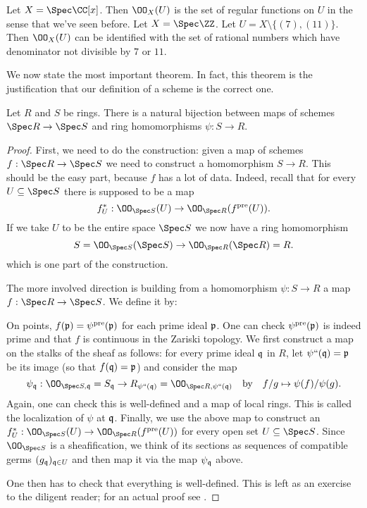 \documentclass[11pt]{scrreprt}
\begin{document}
\begin{example}
	\listhack
	\begin{enumerate}[(a)]
		\ii Let $X = \Spec \CC[x]$.
		Then $\OO_X(U)$ is the set of regular functions on $U$
		in the sense that we've seen before.
		\ii Let $X = \Spec \ZZ$.
		Let $U = X \setminus \{ (7), (11) \}$.
		Then $\OO_X(U)$ can be identified with the set of rational numbers
		which have denominator not divisible by $7$ or $11$.
	\end{enumerate}
\end{example}

We now state the most important theorem.
In fact, this theorem is the justification that our definition
of a scheme is the correct one.
\begin{theorem}
	Let $R$ and $S$ be rings.
	There is a natural bijection between maps of schemes $\Spec R \to \Spec S$	
	and ring homomorphisms $\psi : S \to R$.
\end{theorem}
\begin{proof}
	First, we need to do the construction:
	given a map of schemes $f : \Spec R \to \Spec S$ 
	we need to construct a homomorphism $S \to R$.
	This should be the easy part, because $f$ has a lot of data.
	Indeed, recall that for every $U \subseteq \Spec S$
	there is supposed to be a map
	\[ f^\ast_U : \OO_{\Spec S} (U) \to \OO_{\Spec R}(f\pre(U)). \]
	If we take $U$ to be the entire space $\Spec S$ we now have a ring homomorphism
	\[ S = \OO_{\Spec S} (\Spec S) \to \OO_{\Spec R} (\Spec R) = R. \]
	which is one part of the construction.

	The more involved direction is building from a homomorphism
	$\psi : S \to R$ a map $f : \Spec R \to \Spec S$.
	We define it by:
	\begin{itemize}
		\ii On points, $f(\mathfrak p) = \psi^{\text{pre}}(\mathfrak p)$ for each prime ideal $\mathfrak p$.
		One can check $\psi^{\text{pre}}(\mathfrak p)$ is indeed prime
		and that $f$ is continuous in the Zariski topology.
		\ii We first construct a map on the stalks of the sheaf as follows:
		for every prime ideal $\mathfrak q$ in $R$, let $\psi``(\mathfrak q) = \mathfrak p$ be its image
		(so that $f(\mathfrak q) = \mathfrak p$) and consider the map
		\[ \psi_\qq : \OO_{\Spec S, \qq} = S_{\qq}
			\to R_{\psi``(\qq)} = \OO_{\Spec R, \psi``(\qq)}
			\quad\text{by}\quad f/g \mapsto \psi(f)/\psi(g). \]
		Again, one can check this is well-defined and a map of local rings.
		This is called the localization of $\psi$ at $\mathfrak q$.
		\ii Finally, we use the above map to construct an
		$f^\ast_U : \OO_{\Spec S}(U) \to \OO_{\Spec R}(f\pre(U))$
		for every open set  $U \subseteq \Spec S$.
		Since $\OO_{\Spec S}$ is a sheafification, we think of its
		sections as sequences of compatible germs $(g_\mathfrak q)_{\mathfrak q \in U}$
		and then map it via the map $\psi_\mathfrak q$ above.
	\end{itemize}
	One then has to check that everything is well-defined.
	This is left as an exercise to the diligent reader;
	for an actual proof see \cite[Proposition 6.3.2]{ref:vakil}.
\end{proof}
\end{document}
